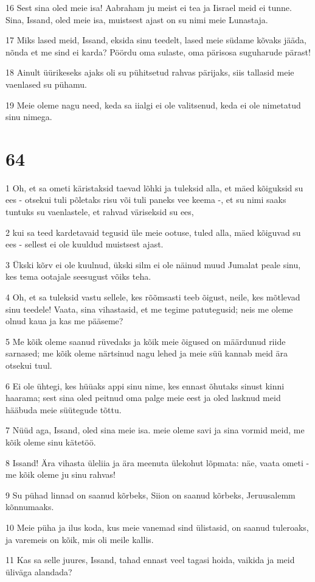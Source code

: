 \par 16 Sest sina oled meie isa! Aabraham ju meist ei tea ja Iisrael meid ei tunne. Sina, Issand, oled meie isa, muistsest ajast on su nimi meie Lunastaja.
\par 17 Miks lased meid, Issand, eksida sinu teedelt, lased meie südame kõvaks jääda, nõnda et me sind ei karda? Pöördu oma sulaste, oma pärisosa suguharude pärast!
\par 18 Ainult üürikeseks ajaks oli su pühitsetud rahvas pärijaks, siis tallasid meie vaenlased su pühamu.
\par 19 Meie oleme nagu need, keda sa iialgi ei ole valitsenud, keda ei ole nimetatud sinu nimega.

\chapter{64}

\par 1 Oh, et sa ometi käristaksid taevad lõhki ja tuleksid alla, et mäed kõiguksid su ees - otsekui tuli põletaks risu või tuli paneks vee keema -, et su nimi saaks tuntuks su vaenlastele, et rahvad väriseksid su ees,
\par 2 kui sa teed kardetavaid tegusid üle meie ootuse, tuled alla, mäed kõiguvad su ees - sellest ei ole kuuldud muistsest ajast.
\par 3 Ükski kõrv ei ole kuulnud, ükski silm ei ole näinud muud Jumalat peale sinu, kes tema ootajale seesugust võiks teha.
\par 4 Oh, et sa tuleksid vastu sellele, kes rõõmsasti teeb õigust, neile, kes mõtlevad sinu teedele! Vaata, sina vihastasid, et me tegime patutegusid; neis me oleme olnud kaua ja kas me pääseme?
\par 5 Me kõik oleme saanud rüvedaks ja kõik meie õigused on määrdunud riide sarnased; me kõik oleme närtsinud nagu lehed ja meie süü kannab meid ära otsekui tuul.
\par 6 Ei ole ühtegi, kes hüüaks appi sinu nime, kes ennast õhutaks sinust kinni haarama; sest sina oled peitnud oma palge meie eest ja oled lasknud meid hääbuda meie süütegude tõttu.
\par 7 Nüüd aga, Issand, oled sina meie isa. meie oleme savi ja sina vormid meid, me kõik oleme sinu kätetöö.
\par 8 Issand! Ära vihasta üleliia ja ära meenuta ülekohut lõpmata: näe, vaata ometi - me kõik oleme ju sinu rahvas!
\par 9 Su pühad linnad on saanud kõrbeks, Siion on saanud kõrbeks, Jeruusalemm kõnnumaaks.
\par 10 Meie püha ja ilus koda, kus meie vanemad sind ülistasid, on saanud tuleroaks, ja varemeis on kõik, mis oli meile kallis.
\par 11 Kas sa selle juures, Issand, tahad ennast veel tagasi hoida, vaikida ja meid üliväga alandada?


